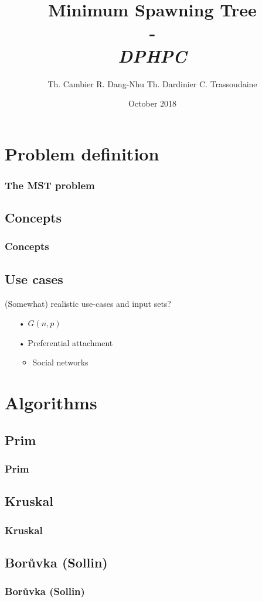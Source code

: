 \documentclass{beamer}
\institute[ETH Zürich]{\textbf{ETH Zürich}}
\date{October 2018}
\author{
    Th. Cambier
    R. Dang-Nhu
    Th. Dardinier
    C. Trassoudaine
}
\title{
	\textbf{Minimum Spawning Tree}\\
	-\\ 
	\textit{DPHPC}
}
\begin{document}
\frame{\titlepage}
\frame{\tableofcontents}

\section{Problem definition}
\begin{frame}
\frametitle{The MST problem}
\end{frame}

\subsection{Concepts}
\begin{frame}
\frametitle{Concepts}
\end{frame}

\subsection{Use cases}

\begin{frame}
(Somewhat) realistic use-cases and input sets?

\begin{itemize}
\item[•] $G(n, p)$
\item[•] Preferential attachment
	\begin{itemize}
	\item Social networks
	\end{itemize}
\end{itemize}
\end{frame}

\section{Algorithms}
\subsection{Prim}
\begin{frame}
\frametitle{Prim}
\end{frame}
\subsection{Kruskal}
\begin{frame}
\frametitle{Kruskal}
\end{frame}
\subsection{Borůvka (Sollin)}
\begin{frame}
\frametitle{Borůvka (Sollin)}
\end{frame}
\end{document}
